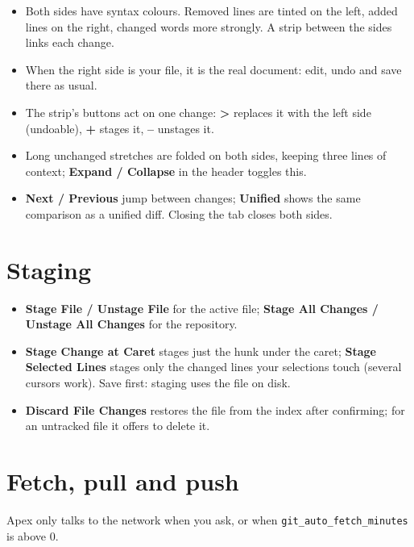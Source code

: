 \documentclass[11pt,a4paper,oneside]{report}
\newcommand{\menu}[1]{\textbf{#1}}
\newcommand{\setting}[1]{\texttt{#1}}
\begin{document}
\begin{itemize}
\item Both sides have syntax colours. Removed lines are tinted on the left,
  added lines on the right, changed words more strongly. A strip between the
  sides links each change.
\item When the right side is your file, it is the real document: edit, undo
  and save there as usual.
\item The strip's buttons act on one change: \menu{>} replaces it with the
  left side (undoable), \menu{+} stages it, \menu{--} unstages it.
\item Long unchanged stretches are folded on both sides, keeping three lines
  of context; \menu{Expand / Collapse} in the header toggles this.
\item \menu{Next / Previous} jump between changes; \menu{Unified} shows the
  same comparison as a unified diff. Closing the tab closes both sides.
\end{itemize}

\section{Staging}

\begin{itemize}
\item \menu{Stage File / Unstage File} for the active file; \menu{Stage All
  Changes / Unstage All Changes} for the repository.
\item \menu{Stage Change at Caret} stages just the hunk under the caret;
  \menu{Stage Selected Lines} stages only the changed lines your selections
  touch (several cursors work). Save first: staging uses the file on disk.
\item \menu{Discard File Changes} restores the file from the index after
  confirming; for an untracked file it offers to delete it.
\end{itemize}

\section{Fetch, pull and push}

Apex only talks to the network when you ask, or when
\setting{git\_auto\_fetch\_minutes} is above 0.
\end{document}
